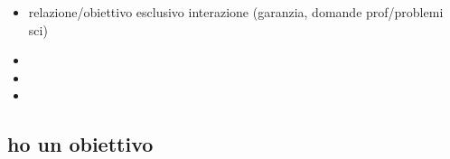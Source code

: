 \begin{itemize}

\item relazione/obiettivo esclusivo interazione (garanzia, domande prof/problemi sci)

\item {}

\item {}

\item {}

\end{itemize}

\subsection{ho un obiettivo}

